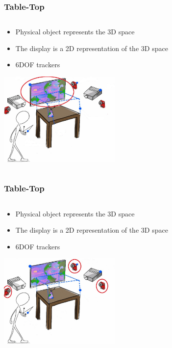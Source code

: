 \documentclass{beamer}
\begin{document}
\begin{frame}
\frametitle{Table-Top} 
	\begin{columns}
    \begin{column}{0.9\textwidth}
    \begin{itemize}
		\item Physical object represents the 3D space
		\item The display is a 2D representation of the 3D space
		\item 6DOF trackers
	\end{itemize}
	
	\begin{center}
	\includegraphics[width=6cm]{images/TabletopDis}
	
	\cite{3D}
	\end{center}
	\end{column}
    \end{columns}
\end{frame}

\begin{frame}
\frametitle{Table-Top} 
	\begin{columns}
    \begin{column}{0.9\textwidth}
    \begin{itemize}
		\item Physical object represents the 3D space
		\item The display is a 2D representation of the 3D space
		\item 6DOF trackers
	\end{itemize}
	
	\begin{center}
	\includegraphics[width=6cm]{images/Tabletop6DOF}
	
	\cite{3D}
	\end{center}
	\end{column}
    \end{columns}
\end{frame}
\end{document}

